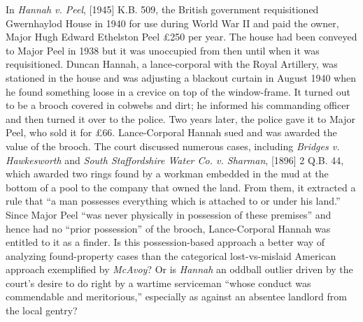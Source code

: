 \item In \textit{Hannah v. Peel}, [1945] K.B. 509, the British government
requisitioned Gwernhaylod House in 1940 for use during World War II and paid
the owner, Major Hugh Edward Ethelston Peel {\pounds}250 per year. The house
had been conveyed to Major Peel in 1938 but it was unoccupied from then until
when it was requisitioned. Duncan Hannah, a lance-corporal with the Royal
Artillery, was stationed in the house and was adjusting a blackout curtain in
August 1940 when he found something loose in a crevice on top of the
window-frame. It turned out to be a brooch covered in cobwebs and dirt; he
informed his commanding officer and then turned it over to the police. Two
years later, the police gave it to Major Peel, who sold it for {\pounds}66.
Lance-Corporal Hannah sued and was awarded the value of the brooch. The court
discussed numerous cases, including \textit{Bridges v. Hawkesworth} and
\textit{South Staffordshire Water Co. v. Sharman}, [1896] 2 Q.B. 44, which
awarded two rings found by a workman embedded in the mud at the bottom of a
pool to the company that owned the land. From them, it extracted a rule that
``a man possesses everything which is attached to or under his land.'' Since
Major Peel ``was never physically in possession of these premises'' and hence
had no ``prior possession'' of the brooch, Lance-Corporal Hannah was entitled
to it as a finder. Is this possession-based approach a better way of analyzing
found-property cases than the categorical lost-vs-mislaid American approach
exemplified by \textit{McAvoy}? Or is \textit{Hannah} an oddball outlier driven
by the court's desire to do right by a wartime serviceman ``whose conduct was
commendable and meritorious,'' especially as against an absentee landlord from
the local gentry?

